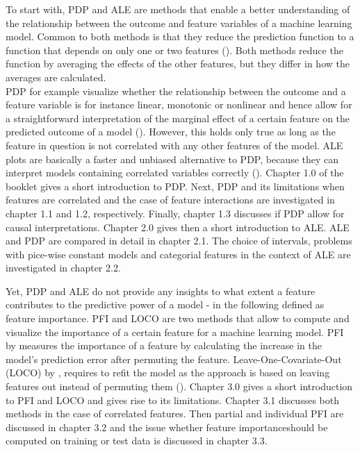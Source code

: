 \documentclass[
]{krantz}
\begin{document}
To start with, PDP and ALE are methods that enable a better understanding of the relationship between the outcome and feature variables of a machine learning model.
Common to both methods is that they reduce the prediction function to a function that depends on only one or two features (\citet{molnar2019}). Both methods reduce the function by averaging the effects of the other features, but they differ in how the averages are calculated.\\
PDP for example visualize whether the relationship between the outcome and a feature variable is for instance linear, monotonic or nonlinear and hence allow for a straightforward interpretation of the marginal effect of a certain feature on the predicted outcome of a model (\citet{friedman2001greedy}). However, this holds only true as long as the feature in question is not correlated with any other features of the model. ALE plots are basically a faster and unbiased alternative to PDP, because they can interpret models containing correlated variables correctly (\citet{molnar2019}). Chapter 1.0 of the booklet gives a short introduction to PDP. Next, PDP and its limitations when features are correlated and the case of feature interactions are investigated in chapter 1.1 and 1.2, respectively. Finally, chapter 1.3 discusses if PDP allow for causal interpretations. Chapter 2.0 gives then a short introduction to ALE. ALE and PDP are compared in detail in chapter 2.1. The choice of intervals, problems with pice-wise constant models and categorial features in the context of ALE are investigated in chapter 2.2.

Yet, PDP and ALE do not provide any insights to what extent a feature contributes to the predictive power of a model - in the following defined as feature importance. PFI and LOCO are two methods that allow to compute and visualize the importance of a certain feature for a machine learning model.
PFI by \citet{breiman2001random} measures the importance of a feature by calculating the increase in the model's prediction error after permuting the feature. Leave-One-Covariate-Out (LOCO) by \citet{lei2018distribution}, requires to refit the model as the approach is based on leaving features out instead of permuting them (\citet{casalicchio2018visualizing}). Chapter 3.0 gives a short introduction to PFI and LOCO and gives rise to its limitations. Chapter 3.1 discusses both methods in the case of correlated features. Then partial and individual PFI are discussed in chapter 3.2 and the issue whether feature importanceshould be computed on training or test data is discussed in chapter 3.3.
\end{document}
